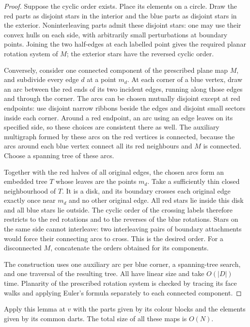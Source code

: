 \begin{proof}
Suppose the cyclic order exists.  Place its elements on a circle.  Draw the
red parts as disjoint stars in the interior and the blue parts as disjoint
stars in the exterior.  Noninterleaving parts admit these disjoint stars:
one may use their convex hulls on each side, with arbitrarily small
perturbations at boundary points.  Joining the two half-edges at each labelled
point gives the required planar rotation system of $M$; the exterior stars
have the reversed cyclic order.

Conversely, consider one connected component of the prescribed plane map
$M$, and subdivide every edge $d$ at a point $m_d$.  At each corner of a blue
vertex, draw an arc between the red ends of its two incident edges, running
along those edges and through the corner.  The arcs can be chosen mutually
disjoint except at red endpoints: use disjoint narrow ribbons beside the
edges and disjoint small sectors inside each corner.  Around a red endpoint,
an arc using an edge leaves on its specified side, so these choices are
consistent there as well.  The auxiliary multigraph formed by these arcs on
the red vertices is connected, because the arcs around each blue vertex
connect all its red neighbours and $M$ is connected.  Choose a spanning tree
of these arcs.

Together with the red halves of all original edges, the chosen arcs form an
embedded tree $T$ whose leaves are the points $m_d$.  Take a sufficiently thin
closed neighbourhood of $T$.  It is a disk, and its boundary crosses each
original edge exactly once near $m_d$ and no other original edge.  All red
stars lie inside this disk and all blue stars lie outside.  The cyclic order
of the crossing labels therefore restricts to the red rotations and to the
reverses of the blue rotations.  Stars on the same side cannot interleave:
two interleaving pairs of boundary attachments would force their connecting
arcs to cross.  This is the desired order.  For a disconnected $M$, concatenate
the orders obtained for its components.

The construction uses one auxiliary arc per blue corner, a spanning-tree
search, and one traversal of the resulting tree.  All have linear size and
take $O(|D|)$ time.  Planarity of the prescribed rotation system is checked
by tracing its face walks and applying Euler's formula separately to each
connected component.
\end{proof}

Apply this lemma at $v$ with the parts given by its colour blocks and the
elements given by its common darts.  The total size of all these maps is
$O(N)$.


